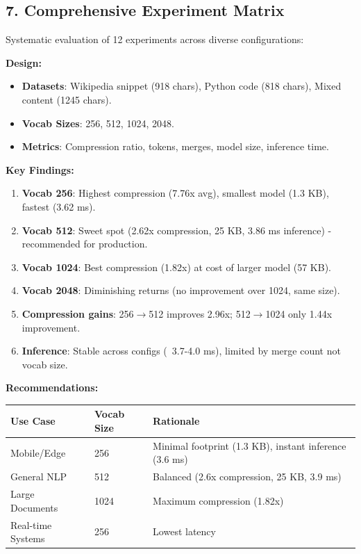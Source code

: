 \documentclass[11pt]{article}
\begin{document}
\subsection{7. Comprehensive Experiment Matrix}
Systematic evaluation of 12 experiments across diverse configurations:

\textbf{Design:}
\begin{itemize}[leftmargin=1.2em]
  \item \textbf{Datasets}: Wikipedia snippet (918 chars), Python code (818 chars), Mixed content (1245 chars).
  \item \textbf{Vocab Sizes}: 256, 512, 1024, 2048.
  \item \textbf{Metrics}: Compression ratio, tokens, merges, model size, inference time.
\end{itemize}

\textbf{Key Findings:}
\begin{enumerate}[leftmargin=1.5em]
  \item \textbf{Vocab 256}: Highest compression (7.76x avg), smallest model (1.3 KB), fastest (3.62 ms).
  \item \textbf{Vocab 512}: Sweet spot (2.62x compression, 25 KB, 3.86 ms inference) - recommended for production.
  \item \textbf{Vocab 1024}: Best compression (1.82x) at cost of larger model (57 KB).
  \item \textbf{Vocab 2048}: Diminishing returns (no improvement over 1024, same size).
  \item \textbf{Compression gains}: 256$\rightarrow$512 improves 2.96x; 512$\rightarrow$1024 only 1.44x improvement.
  \item \textbf{Inference}: Stable across configs (~3.7-4.0 ms), limited by merge count not vocab size.
\end{enumerate}

\textbf{Recommendations:}
\begin{table}[H]
\centering
\begin{tabular}{|l|l|l|}
\hline
\textbf{Use Case} & \textbf{Vocab Size} & \textbf{Rationale} \\
\hline
Mobile/Edge & 256 & Minimal footprint (1.3 KB), instant inference (3.6 ms) \\
\hline
General NLP & 512 & Balanced (2.6x compression, 25 KB, 3.9 ms) \\
\hline
Large Documents & 1024 & Maximum compression (1.82x) \\
\hline
Real-time Systems & 256 & Lowest latency \\
\hline
\end{tabular}
\end{table}
\end{document}
